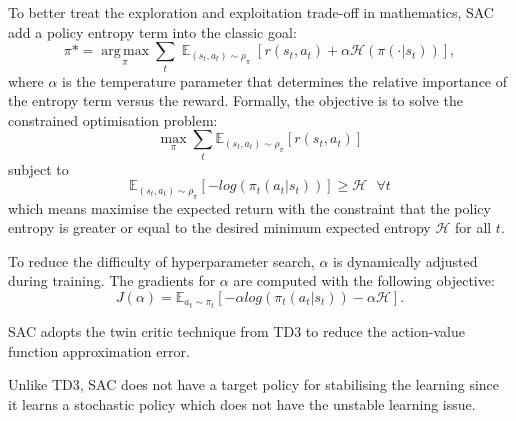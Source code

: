 {To better treat the exploration and exploitation trade-off in mathematics, SAC add a policy entropy term into the classic goal:
\begin{displaymath}
\pi\mbox{*} = \operatorname*{\mathrm{arg\,max}}_\pi \sum_t \mathop{\mathbb{E}}_{(s_t,a_t)\sim\rho_\pi}\left[r(s_t,a_t)+\alpha\mathcal{H}(\pi(\cdot|s_t))\right],
\end{displaymath}
where $\alpha$ is the temperature parameter that determines the relative importance of the entropy term versus the reward. Formally, the objective is to solve the constrained optimisation problem:
\begin{displaymath}
\max_{\pi} \sum_{t} \mathbb{E}_{(s_t, a_t) \sim \rho_\pi} \left[ r(s_t,a_t) \right]
\end{displaymath}
subject to
\begin{displaymath}
\mathbb{E}_{(s_t, a_t) \sim \rho_\pi} \left[ -log(\pi_t(a_t|s_t)) \right] \ge \mathcal{H} \text{   } \forall t
\end{displaymath}
which means maximise the expected return with the constraint that the policy entropy is greater or equal to the desired minimum expected entropy $\mathcal{H}$ for all $t$.

To reduce the difficulty of hyperparameter search, $\alpha$ is dynamically adjusted during training. The gradients for $\alpha$ are computed with the following objective:
\begin{displaymath}
J(\alpha) = \mathbb{E}_{a_t \sim \pi_t} \left[ - \alpha log(\pi_t(a_t|s_t)) - \alpha \mathcal{H} \right].
\end{displaymath}

SAC adopts the twin critic technique from TD3 to reduce the action-value function approximation error.

Unlike TD3, SAC does not have a target policy for stabilising the learning since it learns a stochastic policy which does not have the unstable learning issue.

}
